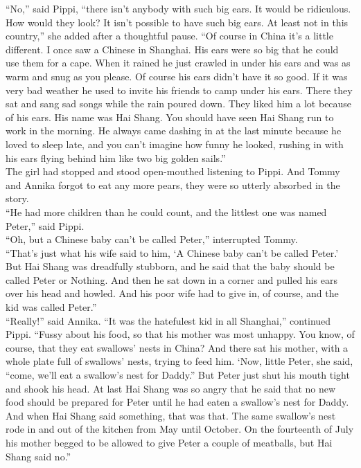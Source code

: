 \documentclass{standard}
\begin{document}
“No,” said Pippi, “there isn’t anybody with such big ears. It would be ridiculous. How would they look? It isn’t possible to have such big ears. At least not in this country,” she added after a thoughtful pause. “Of course in China it’s a little different. I once saw a Chinese in Shanghai. His ears were so big that he could use them for a cape. When it rained he just crawled in under his ears and was as warm and snug as you please. Of course his ears didn’t have it so good. If it was very bad weather he used to invite his friends to camp under his ears. There they sat and sang sad songs while the rain poured down. They liked him a lot because of his ears. His name was Hai Shang. You should have seen Hai Shang run to work in the morning. He always came dashing in at the last minute because he loved to sleep late, and you can’t imagine how funny he looked, rushing in with his ears flying behind him like two big golden sails.”\\

The girl had stopped and stood open-mouthed listening to Pippi. And Tommy and Annika forgot to eat any more pears, they were so utterly absorbed in the story.\\

“He had more children than he could count, and the littlest one was named Peter,” said Pippi.\\

“Oh, but a Chinese baby can’t be called Peter,” interrupted Tommy.\\

“That’s just what his wife said to him, ‘A Chinese baby can’t be called Peter.’ But Hai Shang was dreadfully stubborn, and he said that the baby should be called Peter or Nothing. And then he sat down in a corner and pulled his ears over his head and howled. And his poor wife had to give in, of course, and the kid was called Peter.”\\

“Really!” said Annika. “It was the hatefulest kid in all Shanghai,” continued Pippi. “Fussy about his food, so that his mother was most unhappy. You know, of course, that they eat swallows’ nests in China? And there sat his mother, with a whole plate full of swallows’ nests, trying to feed him. ‘Now, little Peter, she said, “come, we’ll eat a swallow’s nest for Daddy.” But Peter just shut his mouth tight and shook his head. At last Hai Shang was so angry that he said that no new food should be prepared for Peter until he had eaten a swallow’s nest for Daddy. And when Hai Shang said something, that was that. The same swallow’s nest rode in and out of the kitchen from May until October. On the fourteenth of July his mother begged to be allowed to give Peter a couple of meatballs, but Hai Shang said no.”\\
\end{document}
